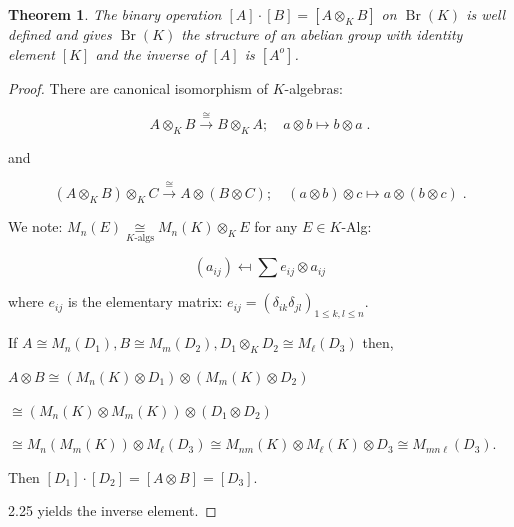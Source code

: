 \documentclass{article}
\theoremstyle{definition}
\theoremstyle{plain}
\newtheorem{theorem}{Theorem}[section]
\theoremstyle{remark}
\begin{document}
    \begin{theorem}
        The binary operation \([A] \cdot [B] = [A \otimes_K B]\) on \(\operatorname{Br}(K)\) is well defined and gives \(\operatorname{Br}(K)\) the structure of an abelian group with identity element \([K]\) and the inverse of \([A]\) is \([A^o]\).
    \end{theorem}

    \begin{proof}
        There are canonical isomorphism of \(K\)-algebras:

        \[
            A \otimes_K B \xrightarrow{\cong} B \otimes_K A ; \quad a \otimes b \mapsto b \otimes a \;.
        \]

        and

        \[
            (A \otimes_K B) \otimes_K C \xrightarrow{\cong} A \otimes (B \otimes C) ; \quad (a \otimes b) \otimes c \mapsto a \otimes (b \otimes c)\;.
        \]

        We note: \(M_n(E) \underset{K\text{-algs}}{\cong} M_n(K) \otimes_K E\) for any \(E \in K\)-Alg:
        
        \[
            (a_{ij}) \mapsfrom \sum e_{ij} \otimes a_{ij}
        \]

        where \(e_{ij}\) is the elementary matrix: \(e_{ij} = (\delta_{ik}\delta_{jl})_{1 \leq k,l \leq n}\).

        If \(A \cong M_n(D_1), B\cong M_m(D_2), D_1 \otimes_K D_2 \cong M_\ell(D_3)\) then,

        \(A \otimes B \cong (M_n(K) \otimes D_1) \otimes (M_m(K) \otimes D_2)\)
        
        \(\cong (M_n(K) \otimes M_m(K)) \otimes (D_1 \otimes D_2)\)

        \(\cong M_n(M_m(K)) \otimes M_\ell(D_3) \cong M_{nm}(K) \otimes M_{\ell}(K) \otimes D_3 \cong M_{mn\ell}(D_3)\).

        Then \([D_1] \cdot [D_2] = [A \otimes B] = [D_3]\).

        2.25 yields the inverse element.
    \end{proof}
\end{document}
